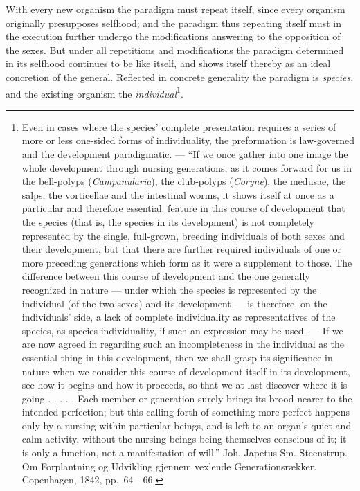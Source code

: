 \documentclass[12pt,a4paper]{book}
\begin{document}
With every new organism the paradigm must repeat itself, since every organism
originally presupposes selfhood; and the paradigm thus repeating itself must in
the execution further undergo the modifications answering to the opposition of
the sexes. But under all repetitions and modifications the paradigm determined
in its selfhood continues to be like itself, and shows itself thereby as an
ideal concretion of the general. Reflected in concrete generality the paradigm
is \emph{species}, and the existing organism the
\emph{individual}\footnote{Even in cases where the species' complete
presentation requires a series of more or less one-sided forms of individuality,
the preformation is law-governed and the development paradigmatic. --- ``If we
once gather into one image the whole development through nursing generations, as
it comes forward for us in the bell-polyps (\textit{Campanularia}), the
club-polyps (\textit{Coryne}), the medusae, the salps, the vorticellae and
the intestinal worms, it shows itself at once as a particular and therefore
essential. feature in this course of development that the species (that is, the
species in its development) is not completely represented by the single,
full-grown, breeding individuals of both sexes and their development, but that
there are further required individuals of one or more preceding generations
which form as it were a supplement to those. The difference between this course
of development and the one generally recognized in nature --- under which the
species is represented by the individual (of the two sexes) and its development
--- is therefore, on the individuals' side, a lack of complete individuality as
representatives of the species, as species-individuality, if such an expression
may be used. --- If we are now agreed in regarding such an incompleteness in the
individual as the essential thing in this development, then we shall grasp its
significance in nature when we consider this course of development itself in its
development, see how it begins and how it proceeds, so that we at last discover
where it is going . . . . . Each member or generation surely brings its brood
nearer to the intended perfection; but this calling-forth of something more
perfect happens only by a nursing within particular beings, and is left to an
organ's quiet and calm activity, without the nursing beings being themselves
conscious of it; it is only a function, not a manifestation of will.'' Joh.
Japetus Sm. Steenstrup. Om Forplantning og Udvikling gjennem vexlende
Generationsrækker. Copenhagen, 1842, pp.~64---66.}.
\end{document}
